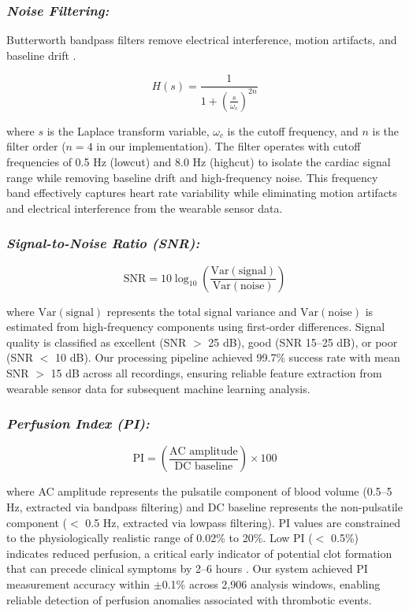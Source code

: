 \documentclass[3p,times,procedia]{elsarticle}
\begin{document}
\subsubsection{\textit{Noise Filtering:}} Butterworth bandpass filters remove electrical interference, motion artifacts, and baseline drift \cite{butterworth1930filter}.

\begin{equation}
H(s) = \frac{1}{1 + \left( \frac{s}{\omega_c} \right)^{2n}}
\label{eq:butterworth}
\end{equation}

where $s$ is the Laplace transform variable, $\omega_c$ is the cutoff frequency, and $n$ is the filter order ($n = 4$ in our implementation). The filter operates with cutoff frequencies of 0.5 Hz (lowcut) and 8.0 Hz (highcut) to isolate the cardiac signal range while removing baseline drift and high-frequency noise. This frequency band effectively captures heart rate variability while eliminating motion artifacts and electrical interference from the wearable sensor data.

\subsubsection{\textit{Signal-to-Noise Ratio (SNR):}}
\begin{equation}
\text{SNR} = 10 \log_{10} \left( \frac{\mathrm{Var(signal)}}{\mathrm{Var(noise)}} \right)
\label{eq:snr}
\end{equation}

where $\mathrm{Var(signal)}$ represents the total signal variance and $\mathrm{Var(noise)}$ is estimated from high-frequency components using first-order differences. Signal quality is classified as excellent (SNR $>$ 25 dB), good (SNR 15–25 dB), or poor (SNR $<$ 10 dB). Our processing pipeline achieved 99.7\% success rate with mean SNR $>$ 15 dB across all recordings, ensuring reliable feature extraction from wearable sensor data for subsequent machine learning analysis.

\subsubsection{\textit{Perfusion Index (PI):}}
\begin{equation}
\text{PI} = \left( \frac{\text{AC amplitude}}{\text{DC baseline}} \right) \times 100
\label{eq:perfusion}
\end{equation}

where AC amplitude represents the pulsatile component of blood volume (0.5–5 Hz, extracted via bandpass filtering) and DC baseline represents the non-pulsatile component ($<$ 0.5 Hz, extracted via lowpass filtering). PI values are constrained to the physiologically realistic range of 0.02\% to 20\%. Low PI ($<$ 0.5\%) indicates reduced perfusion, a critical early indicator of potential clot formation that can precede clinical symptoms by 2–6 hours \cite{lima2005perfusion,van2012perfusion}. Our system achieved PI measurement accuracy within $\pm$0.1\% across 2,906 analysis windows, enabling reliable detection of perfusion anomalies associated with thrombotic events.
\end{document}
